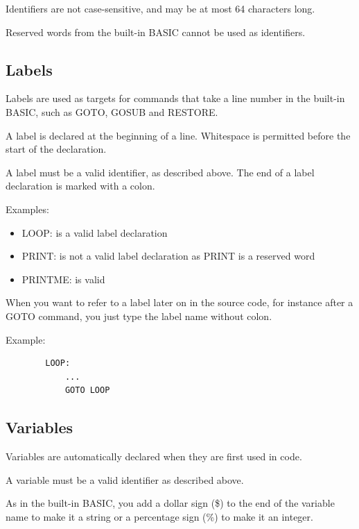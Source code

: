 \documentclass{article}
\begin{document}
        Identifiers are not case-sensitive, and may be at most 64 characters long.

        Reserved words from the built-in BASIC cannot be used as identifiers.

    \subsection{Labels}

        Labels are used as targets for commands that take a line number in
        the built-in BASIC, such as GOTO, GOSUB and RESTORE.

        A label is declared at the beginning of a line. Whitespace is permitted
        before the start of the declaration.

        A label must be a valid identifier, as described above. The end of
        a label declaration is marked with a colon.

        Examples:

        \begin{itemize}
            \item LOOP: is a valid label declaration
            \item PRINT: is not a valid label declaration as PRINT is a reserved word
            \item PRINTME: is valid
        \end{itemize}

        When you want to refer to a label later on in the source code, for
        instance after a GOTO command, you just type the label name without
        colon.

        Example:

        \begin{verbatim}
        LOOP:
            ...
            GOTO LOOP
        \end{verbatim}

    \subsection{Variables}

        Variables are automatically declared when they are first used in
        code.

        A variable must be a valid identifier as described above.

        As in the built-in BASIC, you add a dollar sign (\$) to the end
        of the variable name to make it a string or a percentage sign (\%)
        to make it an integer.
\end{document}
